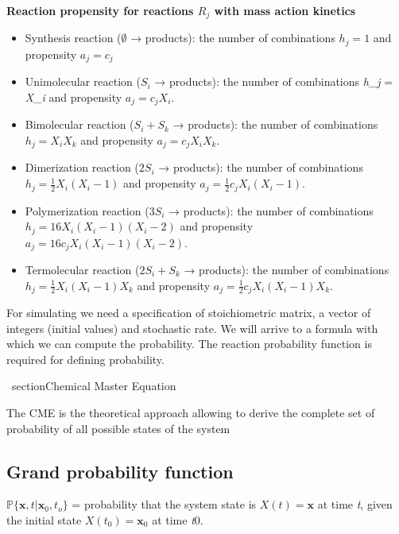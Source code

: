 \textbf{Reaction propensity for reactions $ R_j$  with mass action
kinetics}

\begin{itemize}
\tightlist
\item
  Synthesis reaction ($\emptyset$ → products): the number of combinations
  $ h_j = 1 $ and propensity $ a_j =c_j $
\item
  Unimolecular reaction ($ S_i$  → products): the number of combinations
  \emph{h\_j} = \emph{X\_i} and propensity $ a_j = c_jX_i $.
\item
  Bimolecular reaction ($ S_i + S_k$  → products): the number of
  combinations $ h_j = X_iX_k$  and propensity $ a_j = c_jX_iX_k $.
\item
  Dimerization reaction ($2S_i$ → products): the number of combinations
  $ h_j = \frac{1}{2}X_i(X_i -1) $ and propensity
  $ a_j = \frac{1}{2}c_jX_i(X_i -1) $.
\item
  Polymerization reaction ($3S_i$   → products): the number of
  combinations $ h_j = 16X_i(X_i -1)(X_i -2)$ and propensity
  $ a_j = 16c_jX_i(X_i -1)(X_i -2) $.
\item
  Termolecular reaction ($2S_i + S_k$ → products): the number of
  combinations $ h_j = \frac{1}{2}X_i(X_i -1)X_k$  and propensity
  $ a_j = \frac{1}{2}c_jX_i(X_i -1)X_k $.
\end{itemize}

For simulating we need a specification of stoichiometric matrix, a
vector of integers (initial values) and stochastic rate. We will arrive
to a formula with which we can compute the probability. The reaction
probability function is required for defining probability.

\hypertarget{chemical-master-equation}{%
\ section{Chemical Master Equation}\label{chemical-master-equation}}

The CME is the theoretical approach allowing to derive the complete set
of probability of all possible states of the system

\hypertarget{grand-probability-function}{%
\subsection{Grand probability
function}\label{grand-probability-function}}

$\mathbb{P} \{\mathbf{x},t|\mathbf{x}_0,t_o\}$ = probability that the
system state is $X(t) = \mathbf{x}$ at time \emph{t}, given the
initial state $X(t_0) = \mathbf{x}_0$ at time \emph{t}0.

